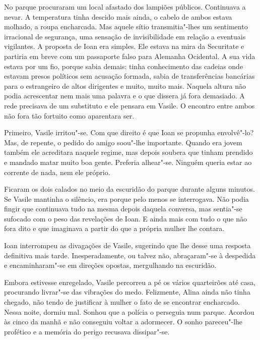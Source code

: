 No parque procuraram um local afastado dos lampiões públicos. Continuava
a nevar. A temperatura tinha descido mais ainda, o cabelo de ambos
estava molhado, a roupa encharcada. Mas aquele sítio transmitia"-lhes um
sentimento irracional de segurança, uma sensação de invisibilidade
em relação a eventuais vigilantes. A proposta de Ioan era simples. Ele
estava na mira da Securitate e partiria em breve com um passaporte falso
para Alemanha Ocidental. A sua vida estava por um fio, porque sabia
demais: tinha conhecimento das cadeias onde estavam presos políticos sem
acusação formada, sabia de transferências bancárias para o estrangeiro
de altos dirigentes e muito, muito mais. Naquela altura não podia
acrescentar nem mais uma palavra e o que dissera já fora demasiado. A
rede precisava de um substituto e ele pensara em Vasile. O encontro
entre ambos não fora tão fortuito como aparentara ser.

\bigskip

Primeiro, Vasile irritou"-se. Com que direito é que Ioan se propunha
envolvê"-lo? Mas, de repente, o pedido do amigo soou"-lhe importante.
Quando era jovem também ele acreditara naquele regime, mas depois
soubera que tinham prendido e mandado matar muito boa gente. Preferia
alhear"-se. Ninguém queria estar ao corrente de nada, nem ele próprio.

Ficaram os dois calados no meio da escuridão do parque durante alguns
minutos. Se Vasile mantinha o silêncio, era porque pelo menos se
interrogava. Não podia fingir
que continuava tudo na mesma depois daquela conversa, mas sentia"-se
sufocado com o peso das revelações de Ioan. E ainda mais com tudo o que
não fora dito e que imaginava a partir do que a própria mulher lhe
contara.

Ioan interrompeu as divagações de Vasile, sugerindo que lhe desse uma
resposta definitiva mais tarde. Inesperadamente, ou talvez não,
abraçaram"-se à despedida e encaminharam"-se em direções opostas,
mergulhando na escuridão.

Embora estivesse enregelado, Vasile percorreu a pé os vários quarteirões
até casa, procurando livrar"-se das vibrações do medo. Felizmente,
Alina ainda não tinha chegado, não tendo de justificar à mulher o fato
de se encontrar encharcado. Nessa noite, dormiu mal. Sonhou que a polícia o perseguia num parque. Acordou às cinco da manhã e não conseguiu
voltar a adormecer. O sonho pareceu"-lhe profético e a memória do perigo
recusava dissipar"-se.

